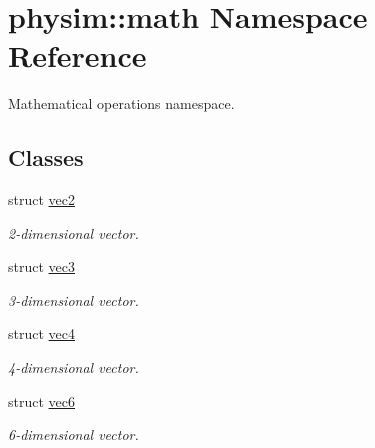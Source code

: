 \hypertarget{namespacephysim_1_1math}{}\section{physim\+:\+:math Namespace Reference}
\label{namespacephysim_1_1math}


Mathematical operations namespace.  


\subsection*{Classes}
\begin{DoxyCompactItemize}
\item 
struct \hyperlink{structphysim_1_1math_1_1vec2}{vec2}
\begin{DoxyCompactList}\small\item\em 2-\/dimensional vector. \end{DoxyCompactList}\item 
struct \hyperlink{structphysim_1_1math_1_1vec3}{vec3}
\begin{DoxyCompactList}\small\item\em 3-\/dimensional vector. \end{DoxyCompactList}\item 
struct \hyperlink{structphysim_1_1math_1_1vec4}{vec4}
\begin{DoxyCompactList}\small\item\em 4-\/dimensional vector. \end{DoxyCompactList}\item 
struct \hyperlink{structphysim_1_1math_1_1vec6}{vec6}
\begin{DoxyCompactList}\small\item\em 6-\/dimensional vector. \end{DoxyCompactList}\end{DoxyCompactItemize}

